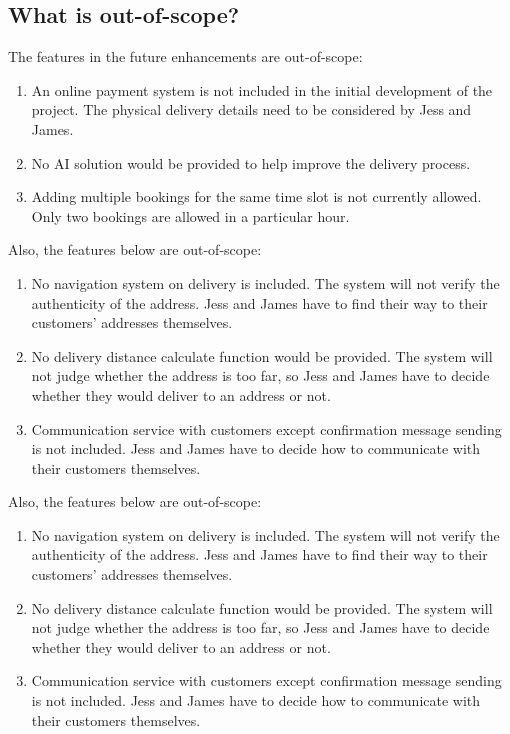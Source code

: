 \documentclass{report}
\begin{document}
\subsection{What is out-of-scope?}
The features in the future enhancements are out-of-scope:
\begin{enumerate}
  \item An online payment system is not included in the initial development of the project. The physical delivery details need to be considered by Jess and James.
  \item No AI solution would be provided to help improve the delivery process.
  \item Adding multiple bookings for the same time slot is not currently allowed. Only two bookings are allowed in a particular hour.
\end{enumerate}

Also, the features below are out-of-scope:
\begin{enumerate}
  \item No navigation system on delivery is included. The system will not verify the authenticity of the address. Jess and James have to find their way to their customers' addresses themselves.
  \item No delivery distance calculate function would be provided. The system will not judge whether the address is too far, so Jess and James have to decide whether they would deliver to an address or not.
  \item Communication service with customers except confirmation message sending is not included. Jess and James have to decide how to communicate with their customers themselves.
\end{enumerate}

Also, the features below are out-of-scope:
\begin{enumerate}
  \item No navigation system on delivery is included. The system will not verify the authenticity of the address. Jess and James have to find their way to their customers' addresses themselves.
  \item No delivery distance calculate function would be provided. The system will not judge whether the address is too far, so Jess and James have to decide whether they would deliver to an address or not. 
  \item Communication service with customers except confirmation message sending is not included. Jess and James have to decide how to communicate with their customers themselves.
\end{enumerate}
\end{document}
